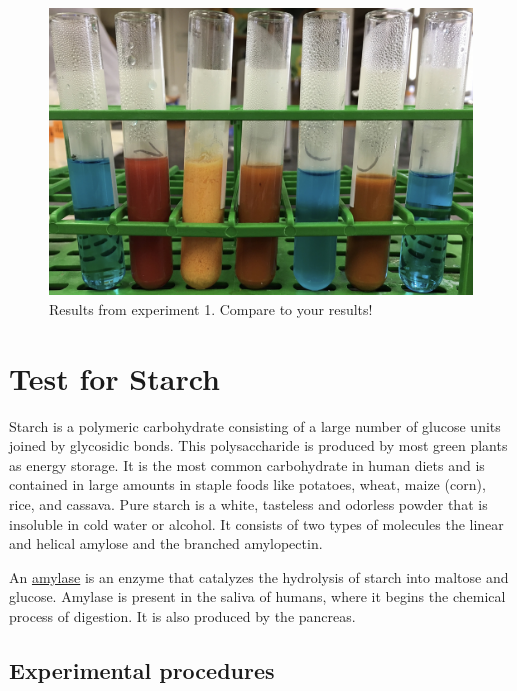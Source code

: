 \begin{figure}

{\centering \includegraphics[width=0.7\linewidth]{./figures/chem_aspects/Results_exp_1}

}

\caption{Results from experiment 1. Compare to your results!}\label{fig:exp1}
\end{figure}

\section{Test for Starch}\label{test-for-starch}

Starch is a polymeric carbohydrate consisting of a large number of
glucose units joined by glycosidic bonds. This polysaccharide is
produced by most green plants as energy storage. It is the most common
carbohydrate in human diets and is contained in large amounts in staple
foods like potatoes, wheat, maize (corn), rice, and cassava. Pure starch
is a white, tasteless and odorless powder that is insoluble in cold
water or alcohol. It consists of two types of molecules the linear and
helical amylose and the branched amylopectin.

An \href{https://en.wikipedia.org/wiki/Amylase}{amylase} is an enzyme
that catalyzes the hydrolysis of starch into maltose and glucose.
Amylase is present in the saliva of humans, where it begins the chemical
process of digestion. It is also produced by the pancreas.

\subsection{Experimental procedures}\label{experimental-procedures-2}

